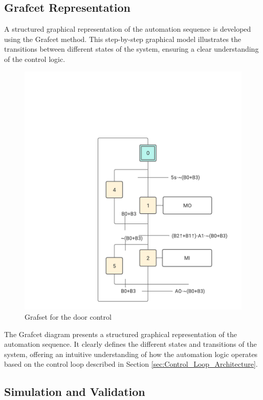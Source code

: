 \subsection{Grafcet Representation} \label{sec:Grafcet_Representation}

A structured graphical representation of the automation sequence is developed using the 
Grafcet method. This step-by-step graphical model illustrates the transitions between 
different states of the system, ensuring a clear understanding of the control logic.

\begin{figure}[H]
    \includegraphics[width=16cm]{Images/Q1/grafset.png}
    \centering
    \caption{Grafset for the door control}
    \label{fig:grafset}
\end{figure}

The Grafcet diagram presents a structured graphical representation of the automation sequence. It clearly defines 
the different states and transitions of the system, offering an intuitive 
understanding of how the automation logic operates based on the control loop described in Section \ref{sec:Control_Loop_Architecture}.

\subsection{Simulation and Validation} \label{sec:Simulation_and_Validation}

